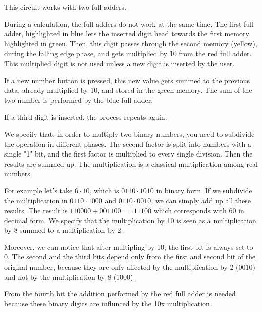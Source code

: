 \documentclass{article}
\begin{document}
This circuit works with two full adders.

\vspace{3mm}

During a calculation, the full adders do not work at the same time. The first full adder, highlighted in blue lets the inserted digit head towards the first memory highlighted in green. Then, this digit passes through the second memory (yellow), during the falling edge phase, and gets multiplied by 10 from the red full adder. This multiplied digit is not used unless a new digit is inserted by the user.

\vspace{3mm}

If a new number button is pressed, this new value gets summed to the previous data, already multiplied by 10, and stored in the green memory. The sum of the two number is performed by the blue full adder.

\vspace{3mm}

If a third digit is inserted, the process repeats again.

\vspace{3mm}

We specify that, in order to multiply two binary numbers, you need to subdivide the operation in different phases. The second factor is split into numbers with a single "1" bit, and the first factor is multiplied to every single division. Then the results are summed up. The multiplication is a classical multiplication among real numbers. 

\vspace{3mm}

For example let's take $6 \cdot 10$, which is $0110 \cdot 1010$ in binary form. If we subdivide the multiplication in $0110 \cdot 1000$ and $0110 \cdot 0010$, we can simply add up all these results. The result is $110000 + 001100 = 111100$ which corresponds with 60 in decimal form. We specify that the multiplication by 10 is seen as a multiplication by 8 summed to a multiplication by 2.

\vspace{3mm}

Moreover, we can notice that after multipling by 10, the first bit is always set to 0. The second and the third bits depend only from the first and second bit of the original number, because they are only affected by the multiplication by 2 (0010) and not by the multiplication by 8 (1000). 

From the fourth bit the addition performed by the red full adder is needed because these binary digits are influnced by the 10x multiplication. %
\end{document}
